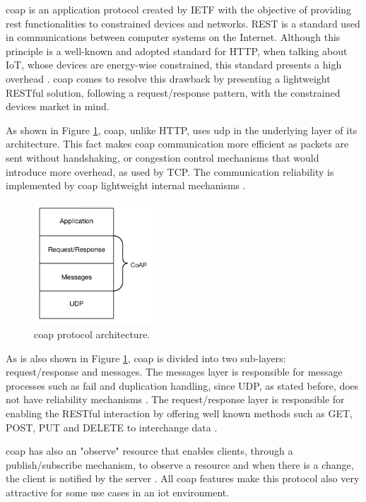 \acf{coap} is an application protocol created by IETF with the objective of providing \acf{rest} functionalities to constrained devices and networks. REST is a standard used in communications between computer systems on the Internet. Although this principle is a well-known and adopted standard for HTTP, when talking about IoT, whose devices are energy-wise constrained, this standard presents a high overhead \cite{Salman2013}. \ac{coap} comes to resolve this drawback by presenting a lightweight RESTful solution, following a request/response pattern, with the constrained devices market in mind.

As shown in Figure \ref{fig:coap}, \ac{coap}, unlike HTTP, uses \ac{udp} in the underlying layer of its architecture. This fact makes \ac{coap} communication more efficient as packets are sent without handshaking, or congestion control mechanisms that would introduce more overhead, as used by TCP. The communication reliability is implemented by \ac{coap} lightweight internal mechanisms \cite{Salman2013}.

\begin{figure}[H]
	\centering
	\includegraphics[width=0.4\textwidth]{figures/coap.png}
	\caption{\ac{coap} protocol architecture.}
	\label{fig:coap}
\end{figure}

As is also shown in Figure \ref{fig:coap}, \ac{coap} is divided into two sub-layers: request/response and messages. The messages layer is responsible for message processes such as fail and duplication handling, since UDP, as stated before, does not have reliability mechanisms \cite{Salman2013}. The request/response layer is responsible for enabling the RESTful interaction by offering well known methods such as GET, POST, PUT and DELETE to interchange data \cite{Lerche2012}.

\ac{coap} has also an "observe" resource that enables clients, through a publish/subscribe mechanism, to observe a resource and when there is a change, the client is notified by the server \cite{Lerche2012}. All \ac{coap} features make this protocol also very attractive for some use cases in an \ac{iot} environment.


